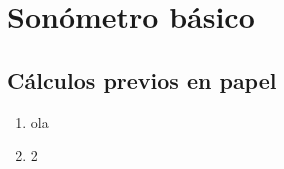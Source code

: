\documentclass{article}
\begin{document}
\section{Sonómetro básico}
\subsection{Cálculos previos en papel}

\begin{enumerate}
    
    \item ola
    \item 2
    
    
\end{enumerate}
\end{document}
